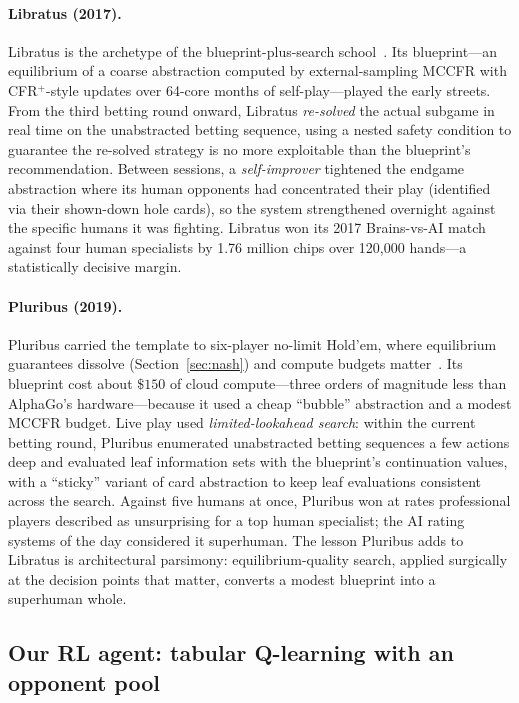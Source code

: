 \paragraph{Libratus (2017).} Libratus is the archetype of the blueprint-plus-search school~\cite{brown2017libratus}. Its blueprint---an equilibrium of a coarse abstraction computed by external-sampling MCCFR with CFR$^{+}$-style updates over 64-core months of self-play---played the early streets. From the third betting round onward, Libratus \emph{re-solved} the actual subgame in real time on the unabstracted betting sequence, using a nested safety condition to guarantee the re-solved strategy is no more exploitable than the blueprint's recommendation. Between sessions, a \emph{self-improver} tightened the endgame abstraction where its human opponents had concentrated their play (identified via their shown-down hole cards), so the system strengthened overnight against the specific humans it was fighting. Libratus won its 2017 Brains-vs-AI match against four human specialists by 1.76 million chips over 120{,}000 hands---a statistically decisive margin.

\paragraph{Pluribus (2019).} Pluribus carried the template to six-player no-limit Hold'em, where equilibrium guarantees dissolve (Section~\ref{sec:nash}) and compute budgets matter~\cite{brown2019pluribus}. Its blueprint cost about $\$150$ of cloud compute---three orders of magnitude less than AlphaGo's hardware---because it used a cheap ``bubble'' abstraction and a modest MCCFR budget. Live play used \emph{limited-lookahead search}: within the current betting round, Pluribus enumerated unabstracted betting sequences a few actions deep and evaluated leaf information sets with the blueprint's continuation values, with a ``sticky'' variant of card abstraction to keep leaf evaluations consistent across the search. Against five humans at once, Pluribus won at rates professional players described as unsurprising for a top human specialist; the AI rating systems of the day considered it superhuman. The lesson Pluribus adds to Libratus is architectural parsimony: equilibrium-quality search, applied surgically at the decision points that matter, converts a modest blueprint into a superhuman whole.

\subsection{Our RL agent: tabular Q-learning with an opponent pool}

